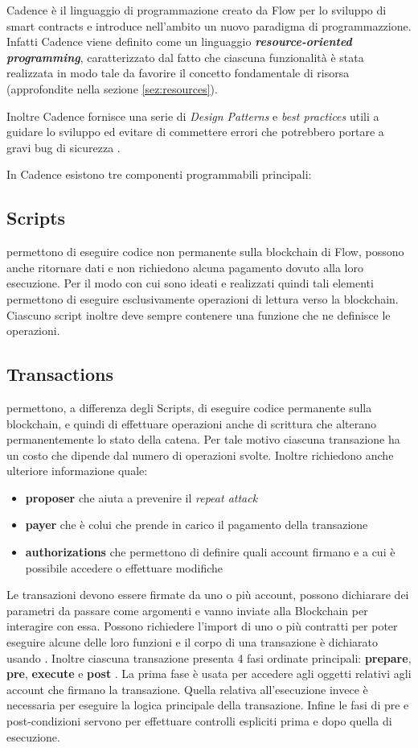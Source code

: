 Cadence è il linguaggio di programmazione creato da Flow per lo sviluppo di smart contracts e introduce nell'ambito un nuovo paradigma di programmazzione. Infatti Cadence viene definito come un linguaggio \textbf{\textit{resource-oriented programming}}, caratterizzato dal fatto che ciascuna funzionalità è stata realizzata in modo tale da favorire il concetto fondamentale di risorsa (approfondite nella sezione \ref{sez:resources}).

Inoltre Cadence fornisce una serie di \textit{Design Patterns} e \textit{best practices} utili a guidare lo sviluppo ed evitare di commettere errori che potrebbero portare a gravi bug di sicurezza \cite{web:design-pattern}.

In Cadence esistono tre componenti programmabili principali:
\subsection*{Scripts}
permettono di eseguire codice non permanente sulla blockchain di Flow, possono anche ritornare dati e non richiedono alcuna pagamento dovuto alla loro esecuzione. Per il modo con cui sono ideati e realizzati quindi tali elementi permettono di eseguire esclusivamente operazioni di lettura verso la blockchain. Ciascuno script inoltre deve sempre contenere una funzione che ne definisce le operazioni.
\subsection*{Transactions}
permettono, a differenza degli Scripts, di eseguire codice permanente sulla blockchain, e quindi di effettuare operazioni anche di scrittura che alterano permanentemente lo stato della catena. Per tale motivo ciascuna transazione ha un costo che dipende dal numero di operazioni svolte. Inoltre richiedono anche ulteriore informazione quale:

\begin{itemize}
    \item \textbf{proposer} che aiuta a prevenire il \textit{repeat attack}
    \item \textbf{payer} che è colui che prende in carico il pagamento della transazione
    \item \textbf{authorizations} che permettono di definire quali account firmano e a cui è possibile accedere o effettuare modifiche
\end{itemize}

Le transazioni devono essere firmate da uno o più account, possono dichiarare dei parametri da passare come argomenti e vanno inviate alla Blockchain per interagire con essa. Possono richiedere l'import di uno o più contratti per poter eseguire alcune delle loro funzioni e il corpo di una transazione è dichiarato usando . Inoltre ciascuna transazione presenta 4 fasi ordinate principali: \textbf{prepare}, \textbf{pre}, \textbf{execute} e \textbf{post} . La prima fase è usata per accedere agli oggetti relativi agli account che firmano la transazione. Quella relativa all'esecuzione invece è necessaria per eseguire la logica principale della transazione. Infine le fasi di pre e post-condizioni servono per effettuare controlli espliciti prima e dopo quella di esecuzione.

